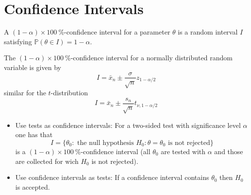 \section{Confidence Intervals}
A $(1-\alpha)\times 100\:\%$-confidence interval for a parameter $\theta$ is a random interval $I$ satisfying $\mathbb{P}(\theta\in I)=1-\alpha$.

The $(1-\alpha)\times 100\:\%$-confidence interval for a normally distributed random variable is given by
\begin{equation*}
    I=\bar{x}_n \pm \frac{\sigma}{\sqrt{n}}z_{1-\alpha/2}
\end{equation*}
similar for the $t$-distribution
\begin{equation*}
    I=\bar{x}_n \pm \frac{s_n}{\sqrt{n}}t_{\nu,1-\alpha/2}
\end{equation*}

\newpar{}

\begin{itemize}
    \item Use tests as confidence intervals: For a two-sided test with significance level $\alpha$ one has that
    \begin{equation*}
        I=\{\theta_0:\text{ the null hypothesis }H_0\colon\theta=\theta_0\text{ is not rejected}\}
    \end{equation*}
    is a $(1-\alpha)\times 100\:\%$-confidence interval (all $\theta_0$ are tested with $\alpha$ and those are collected for wich $H_0$ is not rejected).
    \item Use confidence intervals as tests: If a confidence interval contains $\theta_0$ then $H_0$ is accepted.
\end{itemize}





